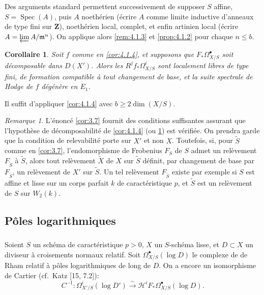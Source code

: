 \documentclass[12pt,a4paper]{article}
\theoremstyle{plain}
\newtheorem{corollary}[theorem]{Corollaire}
\theoremstyle{definition}
\theoremstyle{remark}
\newtheorem{remark}[theorem]{Remarque}
\DeclareMathOperator{\Spec}{Spec}
\begin{document}
Des arguments standard permettent successivement de supposer $S$ affine, $S = \Spec(A)$, puis $A$ noeth\'erien (\'ecrire $A$ comme limite inductive d'anneaux de type fini sur $\mathbf{Z}$), noeth\'erien local, complet, et enfin artinien local (\'ecrire $A = \varprojlim A/\mathfrak{m}^n$). On applique alors \ref{rem:4.1.3} et \ref{prop:4.1.2} pour chaque $n \le b$.

\begin{corollary}\label{cor:4.1.5}
Soit $f$ comme en \ref{cor:4.1.4}, et supposons que $F_* \Omega^{\bullet}_{X/S}$ soit d\'ecomposable dans $D(X')$. Alors les $R^j f_* \Omega^i_{X/S}$ sont localement libres de type fini, de formation compatible \`a tout changement de base, et la suite spectrale de Hodge de $f$ d\'eg\'en\`ere en $E_1$.
\end{corollary}

Il suffit d'appliquer \ref{cor:4.1.4} avec $b \ge 2 \dim(X/S)$.

\begin{remark}\label{rem:4.1.6}
L'\'enonc\'e \ref{cor:3.7} fournit des conditions suffisantes assurant que l'hypoth\`ese de d\'ecomposabilit\'e de \ref{cor:4.1.4} (ou \ref{cor:4.1.5}) est v\'erifi\'ee. On prendra garde que la condition de relevabilit\'e porte sur $X'$ et non $X$. Toutefois, si, pour $\tilde{S}$ comme en \ref{cor:3.7}, l'endomorphisme de Frobenius $F_S$ de $S$ admet un rel\`evement $F_{\tilde{S}}$ \`a $\tilde{S}$, alors tout rel\`evement $\tilde{X}$ de $X$ sur $\tilde{S}$ d\'efinit, par changement de base par $F_{\tilde{S}}$, un rel\`evement de $X'$ sur $\tilde{S}$. Un tel rel\`evement $F_{\tilde{S}}$ existe par exemple si $S$ est affine et lisse sur un corps parfait $k$ de caract\'eristique $p$, et $\tilde{S}$ est un rel\`evement de $S$ sur $W_2(k)$.
\end{remark}

\subsection{P\^oles logarithmiques}

\subsubsection{}

Soient $S$ un sch\'ema de caract\'eristique $p > 0$, $X$ un $S$-sch\'ema lisse, et $D \subset X$ un diviseur \`a croisements normaux relatif. Soit $\Omega^{\bullet}_{X/S}(\log D)$ le complexe de de Rham relatif \`a p\^oles logarithmiques de long de $D$. On a encore un isomorphisme de Cartier (cf.~Katz [15, 7.2]):
\begin{equation}\label{eq:4.2.1.1}
C^{-1}: \Omega^i_{X'/S}(\log D') \xrightarrow{\sim} \mathscr{H}^i F_* \Omega^{\bullet}_{X/S}(\log D).
\end{equation}
\end{document}
